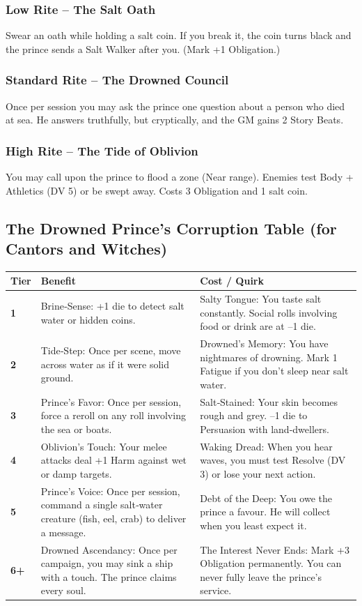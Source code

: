 \documentclass[12pt]{article}
\begin{document}
\subsubsection{Low Rite – The Salt Oath}
Swear an oath while holding a salt coin. If you break it, the coin turns black and the prince sends a Salt Walker after you. (Mark +1 Obligation.)

\subsubsection{Standard Rite – The Drowned Council}
Once per session you may ask the prince one question about a person who died at sea. He answers truthfully, but cryptically, and the GM gains 2 Story Beats.

\subsubsection{High Rite – The Tide of Oblivion}
You may call upon the prince to flood a zone (Near range). Enemies test Body + Athletics (DV 5) or be swept away. Costs 3 Obligation and 1 salt coin.

\subsection{The Drowned Prince’s Corruption Table (for Cantors and Witches)}
\begin{center}
\begin{tabular}{>{\bfseries}l l l}
\toprule
Tier & Benefit & Cost / Quirk \\
\midrule
1 & Brine‑Sense: +1 die to detect salt water or hidden coins. & Salty Tongue: You taste salt constantly. Social rolls involving food or drink are at –1 die. \\
2 & Tide‑Step: Once per scene, move across water as if it were solid ground. & Drowned’s Memory: You have nightmares of drowning. Mark 1 Fatigue if you don’t sleep near salt water. \\
3 & Prince’s Favor: Once per session, force a reroll on any roll involving the sea or boats. & Salt‑Stained: Your skin becomes rough and grey. –1 die to Persuasion with land‑dwellers. \\
4 & Oblivion’s Touch: Your melee attacks deal +1 Harm against wet or damp targets. & Waking Dread: When you hear waves, you must test Resolve (DV 3) or lose your next action. \\
5 & Prince’s Voice: Once per session, command a single salt‑water creature (fish, eel, crab) to deliver a message. & Debt of the Deep: You owe the prince a favour. He will collect when you least expect it. \\
6+ & Drowned Ascendancy: Once per campaign, you may sink a ship with a touch. The prince claims every soul. & The Interest Never Ends: Mark +3 Obligation permanently. You can never fully leave the prince’s service. \\
\bottomrule
\end{tabular}
\end{center}
\end{document}
